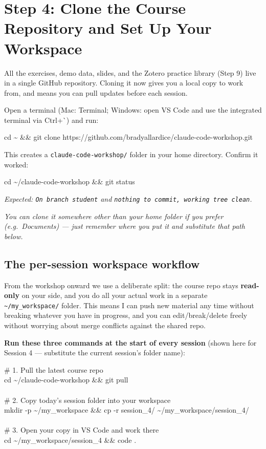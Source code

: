 \documentclass[11pt]{article}
\newcommand{\cmd}[1]{\par\vspace{0.2em}\colorbox{codegray}{\parbox{\dimexpr\linewidth-2\fboxsep}{\ttfamily\small #1}}\par\vspace{0.2em}}
\begin{document}
\section*{Step 4: Clone the Course Repository and Set Up Your Workspace}
All the exercises, demo data, slides, and the Zotero practice library (Step 9) live in a single GitHub repository. Cloning it now gives you a local copy to work from, and means you can pull updates before each session.

Open a terminal (Mac: Terminal; Windows: open VS Code and use the integrated terminal via Ctrl+\`{}) and run:
\cmd{cd \textasciitilde{} \&\& git clone https://github.com/bradyallardice/claude-code-workshop.git}

This creates a \texttt{claude-code-workshop/} folder in your home directory. Confirm it worked:
\cmd{cd \textasciitilde/claude-code-workshop \&\& git status}
\textit{Expected: \texttt{On branch student} and \texttt{nothing to commit, working tree clean}.}

\textit{You can clone it somewhere other than your home folder if you prefer (e.g.\ Documents) --- just remember where you put it and substitute that path below.}

\subsection*{The per-session workspace workflow}
From the workshop onward we use a deliberate split: the course repo stays \textbf{read-only} on your side, and you do all your actual work in a separate \texttt{\textasciitilde/my\_workspace/} folder. This means I can push new material any time without breaking whatever you have in progress, and you can edit/break/delete freely without worrying about merge conflicts against the shared repo.

\textbf{Run these three commands at the start of every session} (shown here for Session 4 --- substitute the current session's folder name):
\cmd{\# 1. Pull the latest course repo\\cd \textasciitilde/claude-code-workshop \&\& git pull\\\\\# 2. Copy today's session folder into your workspace\\mkdir -p \textasciitilde/my\_workspace \&\& cp -r session\_4/ \textasciitilde/my\_workspace/session\_4/\\\\\# 3. Open your copy in VS Code and work there\\cd \textasciitilde/my\_workspace/session\_4 \&\& code .}
\end{document}
